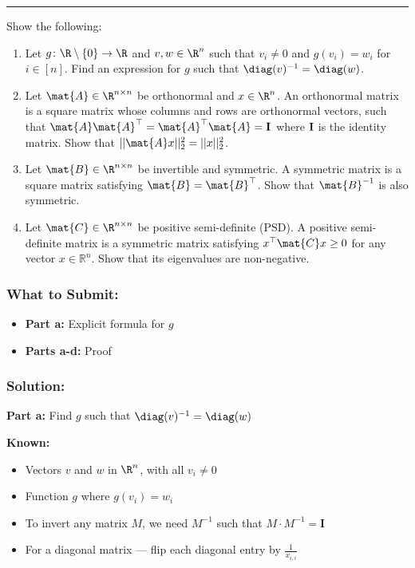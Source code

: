 \documentclass{article}
\begin{document}
\noindent\rule{\textwidth}{0.4pt}

\clearpage{}
\begin{aprob}\label{prob:matrixtype}
    Show the following:
    \begin{enumerate}
        \item {} Let $g\colon \R\setminus\{0\}\rightarrow \R$ and $v, w \in \R^n$ such that $v_i \neq 0$ and $g(v_i) = w_i$ for $i\in[n]$. Find an expression for $g$ such that $\diag(v)^{-1} = \diag(w)$.
        \item {} Let $\mat{A} \in \R^{n \times n}$ be orthonormal and $x \in \R^n$. 
        An orthonormal matrix is a square matrix whose columns and rows are orthonormal vectors, such that $ \mat{A}\mat{A}^\top = \mat{A}^\top \mat{A} = {\bf I}$ where ${\bf I}$ is the identity matrix. 
        Show that $||\mat{A}x||_2^2 = ||x||_2^2$.
        \item {} Let $\mat{B} \in \R^{n \times n}$ be invertible and symmetric. A symmetric matrix is a square matrix satisfying $\mat{B}=\mat{B}^\top$. Show that $\mat{B}^{-1}$ is also symmetric.
        \item {} Let $\mat{C} \in \R^{n \times n}$ be positive semi-definite (PSD). A positive semi-definite matrix is a symmetric matrix satisfying $x^\top \mat{C} x \geq 0$ for any vector $x\in{\mathbb R}^n$. Show that its eigenvalues are non-negative.
    \end{enumerate}
    \subsubsection*{What to Submit:}
    \begin{itemize}
        \item \textbf{Part a:} Explicit formula for $g$
        \item \textbf{Parts a-d:} Proof
    \end{itemize}

    \subsubsection*{Solution:}

    \begin{mdframed}
    \textbf{\large Part a:} Find $g$ such that $\diag(v)^{-1} = \diag(w)$
    \end{mdframed}

    \textbf{Known:}
    \begin{itemize}
        \item Vectors $v$ and $w$ in $\R^n$, with all $v_i \neq 0$
        \item Function $g$ where $g(v_i) = w_i$
        \item To invert any matrix $M$, we need $M^{-1}$ such that $M \cdot M^{-1} = \mathbf{I}$
        \item For a diagonal matrix --- flip each diagonal entry by $\frac{1}{x_{i,i}}$
    \end{itemize}


\end{aprob}
\end{document}
